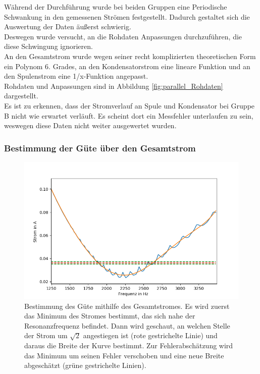 \documentclass[12pt,a4paper]{article}
\begin{document}
Während der Durchführung wurde bei beiden Gruppen eine Periodische Schwankung in den gemessenen Strömen festgestellt. Dadurch gestaltet sich die Auswertung der Daten äußerst schwierig.\\
Deswegen wurde versucht, an die Rohdaten Anpassungen durchzuführen, die diese Schwingung ignorieren.\\
An den Gesamtstrom wurde wegen seiner recht komplizierten theoretischen Form ein Polynom 6. Grades, an den Kondensatorstrom eine lineare Funktion und an den Spulenstrom eine 1/x-Funktion angepasst.\\
Rohdaten und Anpassungen sind in Abbildung \ref{fig:parallel_Rohdaten} dargestellt.\\
Es ist zu erkennen, dass der Stromverlauf an Spule und Kondensator bei Gruppe B nicht wie erwartet verläuft. Es scheint dort ein Messfehler unterlaufen zu sein, weswegen diese Daten nicht weiter ausgewertet wurden.


\subsubsection{Bestimmung der Güte über den Gesamtstrom}
\begin{figure}
\centering
\includegraphics[scale=0.9]{Bilder/Parallel_Iges.png}
\caption{Bestimmung des Güte mithilfe des Gesamtstromes. Es wird zuerst das Minimum des Stromes bestimmt, das sich nahe der Resonanzfrequenz befindet. Dann wird geschaut, an welchen Stelle der Strom um $\sqrt{2}$ angestiegen ist (rote gestrichelte Linie) und daraus die Breite der Kurve bestimmt. Zur Fehlerabschätzung wird das Minimum um seinen Fehler verschoben und eine neue Breite abgeschätzt (grüne gestrichelte Linien). }
\label{fig:parallel_Iges}
\end{figure}
\end{document}
